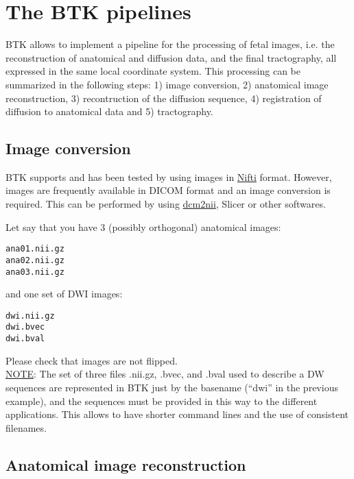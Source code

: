 \section{The BTK pipelines}
BTK allows to implement a pipeline for the processing of fetal images,
i.e. the reconstruction of anatomical and diffusion data, and the final
tractography, all expressed in the same local coordinate system. This
processing can be summarized in the following steps: 1) image conversion, 2) anatomical image reconstruction, 3)
recontruction of the diffusion sequence, 4) registration of diffusion to anatomical data and 5)
tractography.

\subsection{Image conversion}
BTK supports and has been tested by using images in \href{http://nifti.nimh.nih.gov/nifti-1}{Nifti} format. However, images are frequently available in
DICOM format and an image conversion is required. This can be performed by using
\href{http://www.cabiatl.com/mricro/mricron/dcm2nii.html}{dcm2nii}, Slicer or other softwares.

Let say that you have 3 (possibly orthogonal) anatomical images:
\begin{verbatim}
ana01.nii.gz 
ana02.nii.gz 
ana03.nii.gz 
\end{verbatim}

and one set of DWI images: 
\begin{verbatim}
dwi.nii.gz
dwi.bvec 
dwi.bval 
\end{verbatim}

Please check that images are not flipped.\\

\underline{NOTE}: The set of three files .nii.gz, .bvec, and .bval used to
describe a DW sequences are represented in BTK just by the basename (``dwi'' in
the previous example), and the sequences must be provided in this way to the
different applications. This allows to have shorter command lines and the use
of consistent filenames.

\subsection{Anatomical image reconstruction}


